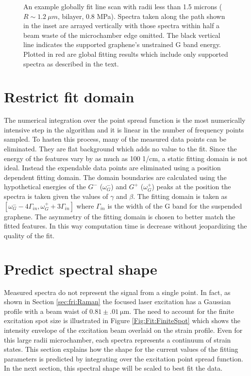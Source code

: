 \begin{figure}
	\begin{center}
	
	\end{center}
	\caption[Global fit for microchambers with radii less than 1.5 microns]{\label{fig:Fit:igouter}
	An example globally fit line scan with radii less than 1.5 microns ($R\sim 1.2 \ \mu m$, bilayer, 0.8 MPa).
	Spectra taken along the path shown in the inset are arrayed vertically with those spectra within half a beam waste of the microchamber edge omitted. 
	The black vertical line indicates the supported graphene's unstrained G band energy.
	Plotted in red are global fitting results which include only supported spectra as described in the text.}
\end{figure}

\section*{Restrict fit domain}
The numerical integration over the point spread function is the most numerically intensive step in the algorithm and it is linear in the number of frequency points sampled.
To hasten this process, many of the measured data points can be eliminated.
They are flat background which adds no value to the fit.
Since the energy of the features vary by as much as 100 1/cm, a static fitting domain is not ideal.
Instead the expendable data points are eliminated using a position dependent fitting domain.
The domain boundaries are calculated using the hypothetical energies of the $G^-$ ($\omega_{G}^-$) and $G^+$ ($\omega_{G}^+$) peaks at the position the spectra is taken given the values of $\gamma$ and $\beta$.
The fitting domain is taken as $[\omega_{G}^- - 4 \Gamma_{in},\omega_{G}^+  +3 \Gamma_{in}]$ where $\Gamma_{in}$ is the width of the G band for the suspended graphene.
The asymmetry of the fitting domain is chosen to better match the fitted features.
In this way computation time is decrease without jeopardizing the quality of the fit.

\section*{Predict spectral shape}
Measured spectra do not represent the signal from a single point.
In fact, as shown in Section \ref{sec:fri:Raman} the focused laser excitation has a Gaussian profile with a beam waist of $0.81 \pm .01 \ \mathrm{\mu m}$.
The need to account for the finite excitation spot size is illustrated in Figure \ref{Fig:Fit:FiniteSpot} which shows the intensity envelope of the excitation beam overlaid on the strain profile.
Even for this large radii microchamber, each spectra represents a continuum of strain states.
This section explains how the shape for the current values of the fitting parameters is predicted by integrating over the excitation point spread function.
In the next section, this spectral shape will be scaled to best fit the data.

